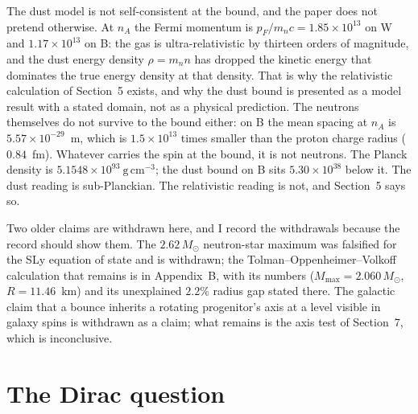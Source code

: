 \documentclass[11pt]{article}
\begin{document}
The dust model is not self-consistent at the bound, and the paper does
not pretend otherwise. At $n_A$ the Fermi momentum is
$p_F/m_n c = 1.85\times10^{13}$ on W and $1.17\times10^{13}$ on B: the
gas is ultra-relativistic by thirteen orders of magnitude, and the dust
energy density $\rho = m_n n$ has dropped the kinetic energy that
dominates the true energy density at that density. That is why the
relativistic calculation of Section~5 exists, and why the dust bound is
presented as a model result with a stated domain, not as a physical
prediction. The neutrons themselves do not survive to the bound either:
on B the mean spacing at $n_A$ is $5.57\times10^{-29}$~m, which is
$1.5\times10^{13}$ times smaller than the proton charge radius
($0.84$~fm). Whatever carries the spin at the bound, it is not neutrons.
The Planck density is $5.1548\times10^{93}\ \mathrm{g\,cm^{-3}}$; the
dust bound on B sits $5.30\times10^{38}$ below it. The dust reading is
sub-Planckian. The relativistic reading is not, and Section~5 says so.

Two older claims are withdrawn here, and I record the withdrawals
because the record should show them. The $2.62\,M_\odot$ neutron-star
maximum was falsified for the SLy equation of state and is withdrawn;
the Tolman--Oppenheimer--Volkoff calculation that remains is in
Appendix~B, with its numbers ($M_{\max} = 2.060\,M_\odot$,
$R = 11.46$~km) and its unexplained $2.2\%$ radius gap stated there. The
galactic claim that a bounce inherits a rotating progenitor's axis at a
level visible in galaxy spins is withdrawn as a claim; what remains is
the axis test of Section~7, which is inconclusive.

\section{The Dirac question}
\end{document}
